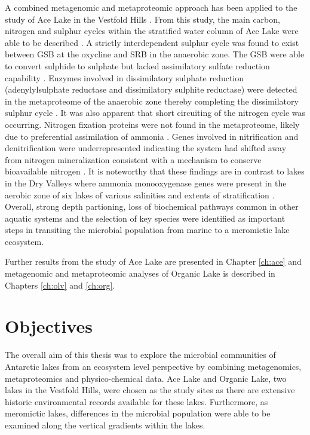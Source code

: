 A combined metagenomic and metaproteomic approach has been applied to the study  of Ace Lake in the Vestfold Hills \cite{Ng2010a, Ng2010b, Lauro2011}. 
From this study, the main carbon, nitrogen and sulphur cycles within the stratified water column of Ace Lake were able to be described \cite{Lauro2011}.
A strictly interdependent sulphur cycle was found to exist between \ac{GSB} at the oxycline and \ac{SRB} in the anaerobic zone.
The \ac{GSB} were able to convert sulphide to sulphate but lacked assimilatory sulfate reduction capability \cite{Ng2010a, Ng2010b, Lauro2011}. 
Enzymes involved in dissimilatory sulphate reduction (adenylylsulphate reductase and dissimilatory sulphite reductase) were detected in the metaproteome of the anaerobic zone thereby completing the dissimilatory sulphur cycle \cite{Ng2010a, Ng2010b}.
It was also apparent that short circuiting of the nitrogen cycle was occurring. 
Nitrogen fixation proteins were not found in the metaproteome, likely due to preferential assimilation of ammonia \cite{Ng2010a, Ng2010b, Lauro2011}.  
Genes involved in nitrification and denitrification were underrepresented indicating the system had shifted away from nitrogen mineralization consistent with a mechanism to conserve bioavailable nitrogen \cite{Lauro2011}. 
It is noteworthy that these findings are in contrast to lakes in the Dry Valleys where ammonia monooxygenase genes were present in the aerobic zone of six lakes of various salinities and extents of stratification \cite{Voytek1999}.
Overall, strong depth partioning, loss of biochemical pathways common in other aquatic systems and the selection of key species were identified as important steps in transiting the microbial population from marine to a meromictic lake ecosystem.

Further results from the study of Ace Lake are presented in Chapter \ref{ch:ace} and metagenomic and metaproteomic analyses of Organic Lake is described in Chapters \ref{ch:olv} and \ref{ch:org}.

\section{Objectives}
The overall aim of this thesis was to explore the microbial communities of Antarctic lakes from an ecosystem level perspective by combining metagenomics, metaproteomics and physico-chemical data.
Ace Lake and Organic Lake, two lakes in the Vestfold Hills, were chosen as the study sites as there are extensive historic environmental records available for these lakes.
Furthermore, as meromictic lakes, differences in the microbial population were able to be examined along the vertical gradients within the lakes.


